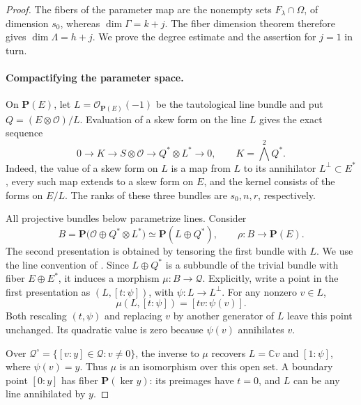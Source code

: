 \begin{proof}
The fibers of the parameter map are the nonempty sets $F_\lambda\cap\Omega$, of dimension $s_0$, whereas $\dim\Gamma=k+j$.  The fiber dimension theorem therefore gives $\dim\Lambda=h+j$.  We prove the degree estimate and the assertion for $j=1$ in turn.

\paragraph{Compactifying the parameter space.}
On $\mathbf{P}(E)$, let $L=\mathcal{O}_{\mathbf{P}(E)}(-1)$ be the tautological line bundle and put $Q=(E\otimes\mathcal{O})/L$.  Evaluation of a skew form on the line $L$ gives the exact sequence
\begin{equation}
 0\longrightarrow K\longrightarrow S\otimes\mathcal{O}
 \longrightarrow Q^*\otimes L^*\longrightarrow0,
 \qquad K=\bigwedge^2 Q^*.
 \label{eq:conc-deg-evaluation}
\end{equation}
Indeed, the value of a skew form on $L$ is a map from $L$ to its annihilator $L^\perp\subset E^*$, every such map extends to a skew form on $E$, and the kernel consists of the forms on $E/L$.  The ranks of these three bundles are $s_0,n,r$, respectively.

All projective bundles below parametrize lines.  Consider
\begin{equation}
 B=\mathbf{P}\bigl(\mathcal{O}\oplus Q^*\otimes L^*\bigr)
   \simeq\mathbf{P}(L\oplus Q^*),
 \qquad \rho:B\longrightarrow\mathbf{P}(E).
 \label{eq:conc-deg-parameter-bundle}
\end{equation}
The second presentation is obtained by tensoring the first bundle with $L$.  We use the line convention of \cite[Section~3.1 and Example~3.1.1]{Ful}.  Since $L\oplus Q^*$ is a subbundle of the trivial bundle with fiber $E\oplus E^*$, it induces a morphism $\mu:B\to\mathcal{Q}$.  Explicitly, write a point in the first presentation as $(L,[t:\psi])$, with $\psi:L\to L^\perp$.  For any nonzero $v\in L$,
\begin{equation}
 \mu(L,[t:\psi])=[tv:\psi(v)].
 \label{eq:conc-deg-parameter-map}
\end{equation}
Both rescaling $(t,\psi)$ and replacing $v$ by another generator of $L$ leave this point unchanged.  Its quadratic value is zero because $\psi(v)$ annihilates $v$.

Over $\mathcal{Q}^\circ=\{[v:y]\in\mathcal{Q}:v\ne0\}$, the inverse to $\mu$ recovers $L=\mathbb{C}v$ and $[1:\psi]$, where $\psi(v)=y$.  Thus $\mu$ is an isomorphism over this open set.  A boundary point $[0:y]$ has fiber $\mathbf{P}(\ker y)$: its preimages have $t=0$, and $L$ can be any line annihilated by $y$.


\end{proof}
